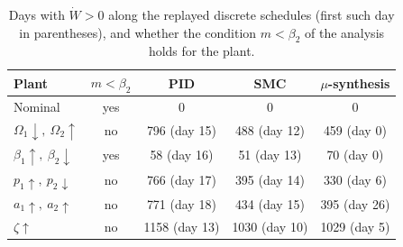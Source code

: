 \begin{table}[htbp]
\centering
\caption{Days with $\dot{W}>0$ along the replayed discrete schedules (first such day in parentheses), and whether the condition $m<\beta_2$ of the analysis holds for the plant.}
\label{tab:lyapunov_groups}
\small
\begin{tabular}{lcccc}
\toprule
Plant & $m<\beta_2$ & PID & SMC & $\mu$-synthesis \\
\midrule
Nominal & yes & 0 & 0 & 0 \\
$\Omega_1 \downarrow,\ \Omega_2 \uparrow$ & no & 796 (day 15) & 488 (day 12) & 459 (day 0) \\
$\beta_1 \uparrow,\ \beta_2 \downarrow$ & yes & 58 (day 16) & 51 (day 13) & 70 (day 0) \\
$p_1 \uparrow,\ p_2 \downarrow$ & no & 766 (day 17) & 395 (day 14) & 330 (day 6) \\
$a_1 \uparrow,\ a_2 \uparrow$ & no & 771 (day 18) & 434 (day 15) & 395 (day 26) \\
$\zeta \uparrow$ & no & 1158 (day 13) & 1030 (day 10) & 1029 (day 5) \\
\bottomrule
\end{tabular}
\end{table}
